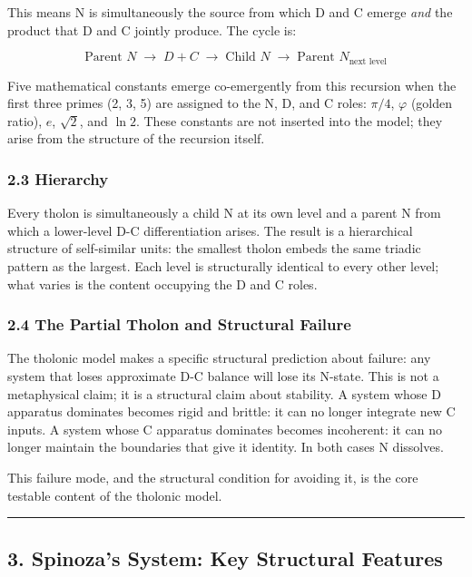 \documentclass[
  11pt,
  letterpaper,
]{article}
\begin{document}
This means N is simultaneously the source from which D and C emerge
\emph{and} the product that D and C jointly produce. The cycle is:

\[\text{Parent } N \;\to\; D + C \;\to\; \text{Child } N \;\to\; \text{Parent } N_{\text{next level}}\]

Five mathematical constants emerge co-emergently from this recursion
when the first three primes (2, 3, 5) are assigned to the N, D, and C
roles: \(\pi/4\), \(\varphi\) (golden ratio), \(e\), \(\sqrt{2}\), and
\(\ln 2\). These constants are not inserted into the model; they arise
from the structure of the recursion itself.

\subsubsection{2.3 Hierarchy}\label{hierarchy}

Every tholon is simultaneously a child N at its own level and a parent N
from which a lower-level D-C differentiation arises. The result is a
hierarchical structure of self-similar units: the smallest tholon embeds
the same triadic pattern as the largest. Each level is structurally
identical to every other level; what varies is the content occupying the
D and C roles.

\subsubsection{2.4 The Partial Tholon and Structural
Failure}\label{the-partial-tholon-and-structural-failure}

The tholonic model makes a specific structural prediction about failure:
any system that loses approximate D-C balance will lose its N-state.
This is not a metaphysical claim; it is a structural claim about
stability. A system whose D apparatus dominates becomes rigid and
brittle: it can no longer integrate new C inputs. A system whose C
apparatus dominates becomes incoherent: it can no longer maintain the
boundaries that give it identity. In both cases N dissolves.

This failure mode, and the structural condition for avoiding it, is the
core testable content of the tholonic model.

\begin{center}\rule{0.5\linewidth}{0.5pt}\end{center}

\subsection{3. Spinoza's System: Key Structural
Features}\label{spinozas-system-key-structural-features}
\end{document}
